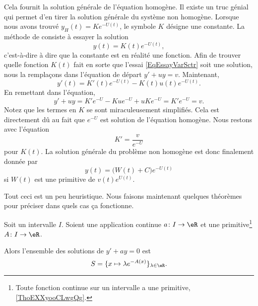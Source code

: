 Cela fournit la solution générale de l'équation homogène. Il existe un truc génial qui permet d'en tirer la solution générale du système non homogène. Lorsque nous avons trouvé \( y_H(t)=K e^{-U(t)}\), le symbole \( K\) désigne une constante. La méthode de  consiste à essayer la solution
\begin{equation}		\label{EqEssayVarSctr}
	y(t)=K(t) e^{-U(t)},
\end{equation}
c'est-à-dire à dire que la constante est en réalité une fonction. Afin de trouver quelle fonction \( K(t)\) fait en sorte que l'essai \eqref{EqEssayVarSctr} soit une solution, nous la remplaçons dans l'équation de départ \( y'+uy=v\). Maintenant,
\begin{equation}
	y'(t)=K'(t) e^{-U(t)}-K(t)u(t) e^{-U(t)}.
\end{equation}
En remettant dans l'équation,
\begin{equation}
	y'+uy=K' e^{-U}-Ku e^{-U}+uK e^{-U}=K' e^{-U}=v.
\end{equation}
Notez que les termes en \( K\) se sont miraculeusement simplifiés. Cela est directement dû au fait que \(  e^{-U}\) est solution de l'équation homogène. Nous restons avec l'équation
\begin{equation}
	K'=\frac{ v }{  e^{-U} }
\end{equation}
pour \( K(t)\). La solution générale du problème non homogène est donc finalement donnée par
\begin{equation}
	y(t)=\big( W(t)+C \big) e^{-U(t)}
\end{equation}
si \( W(t)\) est une primitive de \( v(t)e^{U(t)}\).

Tout ceci est un peu heuristique. Nous faisons maintenant quelques théorèmes pour préciser dans quels cas ça fonctionne.

\begin{proposition}	\label{PROPooFECJooPiqZHR}
	Soit un intervalle \( I\). Soient une application continue \(a \colon I\to \eR  \) et une primitive\footnote{Toute fonction continue sur un intervalle a une primitive, \ref{ThoEXXyooCLwgQg}.} \(A \colon I\to \eR  \).

	Alors l'ensemble des solutions de \( y'+ay=0\) est
	\begin{equation}
		S=\{ x\mapsto \lambda e^{-A(x)} \}_{\lambda\in \eR}.
	\end{equation}
\end{proposition}

